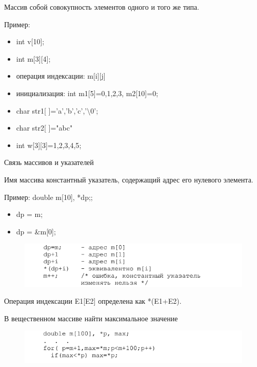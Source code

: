 \documentclass{beamer}
\begin{document}
\begin{frame}
\begin{block}{Массив}
собой совокупность элементов одного и того же типа. 
\end{block}
Пример:
\begin{itemize}
\item int v[10];
\item int m[3][4];
\item операция индексации: m[i][j]
\item инициализация: int m1[5]={0,1,2,3}, m2[10]={0};
\item char str1[ ]={'a','b','c','$\setminus$0'};
\item char str2[ ]="abc"
\item int w[3][3]={{1,2,3},{4,5}};
\end{itemize}
\end{frame}

\begin{frame}{Связь массивов и указателей}
\begin{block}{Имя массива}
константный указатель, содержащий адрес его нулевого элемента.
\end{block}
Пример:
double m[10], *dp;;
\begin{itemize}
\item dp = m;
\item dp = \&m[0];
\end{itemize}
\begin{figure}[h]
\centering
\includegraphics[scale=0.75]{images/lec03-pic24.png}
\end{figure}
Операция индексации E1[E2] определена как *(E1+E2).
\end{frame}

\begin{frame}{В вещественном массиве найти максимальное значение}
\begin{figure}[h]
\centering
\includegraphics[scale=0.75]{images/lec03-pic25.png}
\end{figure}
\end{frame}
\end{document}
